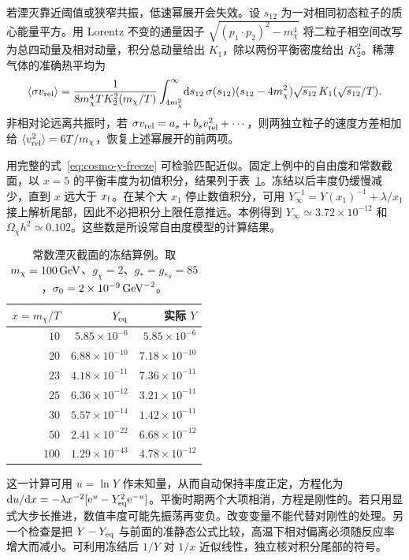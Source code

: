 若湮灭靠近阈值或狭窄共振，低速幂展开会失效。设 $s_{12}$ 为一对相同初态粒子的质心能量平方。用 Lorentz 不变的通量因子 $\sqrt{(p_1\cdot p_2)^2-m_\chi^4}$ 将二粒子相空间改写为总四动量及相对动量，积分总动量给出 $K_1$，除以两份平衡密度给出 $K_2^2$。稀薄气体的准确热平均为
\[
 \langle\sigma v_{\rm rel}\rangle=
 \frac{1}{8m_\chi^4 T K_2^2(m_\chi/T)}
 \int_{4m_\chi^2}^\infty \!\dd s_{12}\,
 \sigma(s_{12})(s_{12}-4m_\chi^2)\sqrt{s_{12}}\,
 K_1(\sqrt{s_{12}}/T).
\]
非相对论远离共振时，若 $\sigma v_{\rm rel}=a_s+b_s v_{\rm rel}^2+\cdots$，则两独立粒子的速度方差相加给 $\langle v_{\rm rel}^2\rangle=6T/m_\chi$，恢复上述幂展开的前两项。

用完整的式~\eqref{eq:cosmo-y-freeze} 可检验匹配近似。固定上例中的自由度和常数截面，以 $x=5$ 的平衡丰度为初值积分，结果列于表~\ref{tab:cosmo-freeze-example}。冻结以后丰度仍缓慢减少，直到 $x$ 远大于 $x_{\rm f}$。在某个大 $x_1$ 停止数值积分，可用 $Y_\infty^{-1}=Y(x_1)^{-1}+\lambda/x_1$ 接上解析尾部，因此不必把积分上限任意推远。本例得到 $Y_\infty\simeq3.72\times10^{-12}$ 和 $\Omega_\chi h^2\simeq0.102$。这些数是所设常自由度模型的计算结果。

\begin{table}[htbp]
\centering\small
\caption{常数湮灭截面的冻结算例。取 $m_\chi=100\,{\rm GeV}$、$g_\chi=2$、$g_*=g_{*s}=85$，$\sigma_0=2\times10^{-9}\,{\rm GeV}^{-2}$。}\label{tab:cosmo-freeze-example}
\begin{tabular}{@{}rrr@{}}\toprule
$x=m_\chi/T$ & $Y_{\rm eq}$ & 实际 $Y$ \\ \midrule
$10$ & $5.85\times10^{-6}$ & $5.85\times10^{-6}$ \\
$20$ & $6.88\times10^{-10}$ & $7.18\times10^{-10}$ \\
$23$ & $4.18\times10^{-11}$ & $7.36\times10^{-11}$ \\
$25$ & $6.36\times10^{-12}$ & $3.21\times10^{-11}$ \\
$30$ & $5.57\times10^{-14}$ & $1.42\times10^{-11}$ \\
$50$ & $2.41\times10^{-22}$ & $6.68\times10^{-12}$ \\
$100$ & $1.29\times10^{-43}$ & $4.78\times10^{-12}$ \\ \bottomrule
\end{tabular}
\end{table}

这一计算可用 $u=\ln Y$ 作未知量，从而自动保持丰度正定，方程化为 $\dd u/\dd x=-\lambda x^{-2}[\mathrm{e}^u-Y_{\rm eq}^2\mathrm{e}^{-u}]$。平衡时期两个大项相消，方程是刚性的。若只用显式大步长推进，数值丰度可能先振荡再变负。改变变量不能代替对刚性的处理。另一个检查是把 $Y-Y_{\rm eq}$ 与前面的准静态公式比较，高温下相对偏离必须随反应率增大而减小。可利用冻结后 $1/Y$ 对 $1/x$ 近似线性，独立核对积分尾部的符号。

